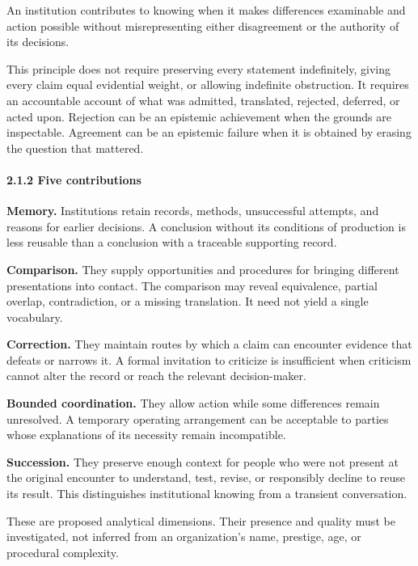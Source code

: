 \documentclass[
  10pt,
]{article}
\renewenvironment{quote}
  {\begin{leftbar}\small}
  {\end{leftbar}}
\begin{document}
\begin{quote}
An institution contributes to knowing when it makes differences examinable and action possible without misrepresenting either disagreement or the authority of its decisions.
\end{quote}

This principle does not require preserving every statement indefinitely, giving every claim equal evidential weight, or allowing indefinite obstruction. It requires an accountable account of what was admitted, translated, rejected, deferred, or acted upon. Rejection can be an epistemic achievement when the grounds are inspectable. Agreement can be an epistemic failure when it is obtained by erasing the question that mattered.

\paragraph{2.1.2 Five contributions}\label{five-contributions}

\textbf{Memory.} Institutions retain records, methods, unsuccessful attempts, and reasons for earlier decisions. A conclusion without its conditions of production is less reusable than a conclusion with a traceable supporting record.

\textbf{Comparison.} They supply opportunities and procedures for bringing different presentations into contact. The comparison may reveal equivalence, partial overlap, contradiction, or a missing translation. It need not yield a single vocabulary.

\textbf{Correction.} They maintain routes by which a claim can encounter evidence that defeats or narrows it. A formal invitation to criticize is insufficient when criticism cannot alter the record or reach the relevant decision-maker.

\textbf{Bounded coordination.} They allow action while some differences remain unresolved. A temporary operating arrangement can be acceptable to parties whose explanations of its necessity remain incompatible.

\textbf{Succession.} They preserve enough context for people who were not present at the original encounter to understand, test, revise, or responsibly decline to reuse its result. This distinguishes institutional knowing from a transient conversation.

These are proposed analytical dimensions. Their presence and quality must be investigated, not inferred from an organization's name, prestige, age, or procedural complexity.
\end{document}
